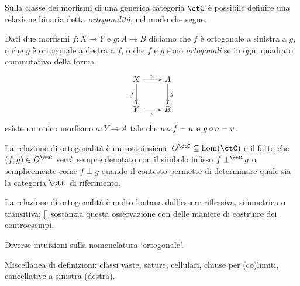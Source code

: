 Sulla classe dei morfismi di una generica categoria \(\ctC\) è possibile definire una relazione binaria detta \emph{ortogonalità}, nel modo che segue.
\begin{definition}\label{def_ortogona}
	Dati due morfismi \(f : X\to Y\) e \(g : A\to B\) diciamo che \(f\) è ortogonale a sinistra a \(g\), o che \(g\) è ortogonale a destra a \(f\), o che \(f\) e \(g\) sono \emph{ortogonali} se in ogni quadrato commutativo della forma
	\[
		\vcenter{\xymatrix{%
				X \ar[r]^u\ar[d]_f & A\ar[d]^g\\
				Y \ar[r]_v & B
			}}\]
	esiste un unico morfismo \(a : Y\to A\) tale che \(a\circ f=u\) e \(g\circ a=v\).
\end{definition}
La relazione di ortogonalità è un sottoinsieme \(O^\ctC \subseteq \hom(\ctC)\) e il fatto che \((f,g)\in O^\ctC\) verrà sempre denotato con il simbolo infisso \(f\perp^\ctC g\) o semplicemente come \(f\perp g\) quando il contesto permette di determinare quale sia la categoria \(\ctC\) di riferimento.

La relazione di ortogonalità è molto lontana dall'essere riflessiva, simmetrica o transitiva; \ref{} sostanzia questa osservazione con delle maniere di costruire dei controesempi.
\begin{remark}\label{perche_ortogonale}
	Diverse intuizioni sulla nomenclatura `ortogonale'.
\end{remark}
\begin{definition}
	Miscellanea di definizioni: classi vaste, sature, cellulari, chiuse per (co)limiti, cancellative a sinistra (destra).
\end{definition}
